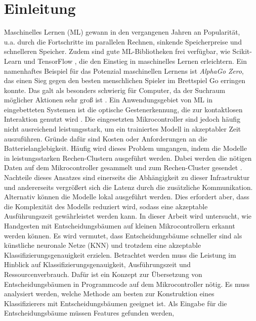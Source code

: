 \chapter{Einleitung}
Maschinelles Lernen (ML) gewann in den vergangenen Jahren an Popularität, u.a. durch die Fortschritte im parallelen Rechnen,
sinkende Speicherpreise und schnelleren Speicher. Zudem sind gute ML-Bibliotheken frei verfügbar, wie Scikit-Learn \cite{scikit-learn} und TensorFlow \cite{abadi2016tensorflow}, die
den Einstieg in maschinelles Lernen erleichtern. Ein namenhaftes Beispiel für das Potenzial maschinellen Lernens ist \textit{AlphaGo Zero},
das einen Sieg gegen den besten menschlichen Spieler im Brettspiel Go erringen konnte. Das galt als besonders schwierig für Computer,
da der Suchraum möglicher Aktionen sehr groß ist \cite{silver2017mastering}.
\newline
\newline
Ein Anwendungsgebiet von ML in eingebetteten Systemen ist die optische Gestenerkennung, die zur kontaktlosen Interaktion genutzt wird \cite{pavlovic1997visual}.
Die eingesetzten Mikrocontroller sind jedoch häufig nicht ausreichend leistungsstark, um ein trainiertes Modell in akzeptabler Zeit auszuführen. Gründe dafür sind
Kosten oder Anforderungen an die Batterielanglebigkeit. Häufig wird dieses Problem umgangen, indem die Modelle in leistungsstarken Rechen-Clustern ausgeführt werden.
Dabei werden die nötigen Daten auf dem Mikrocontroller gesammelt und zum Rechen-Cluster gesendet \cite{venzkeArticle}. Nachteile dieses Ansatzes sind einerseits die Abhängigkeit zu dieser
Infrastruktur und andererseits vergrößert sich die Latenz durch die zusätzliche Kommunikation. Alternativ können die Modelle lokal ausgeführt werden. Dies erfordert aber, dass die
Komplexität des Modells reduziert wird, sodass eine akzeptable Ausführungszeit gewährleistet werden kann.
\newline
\newline
In dieser Arbeit wird untersucht, wie Handgesten mit Entscheidungsbäumen auf kleinen Mikrocontrollern erkannt werden können. Es wird vermutet, dass Entscheidungsbäume schneller sind als künstliche neuronale Netze (KNN) und
trotzdem eine akzeptable Klassifizierungsgenauigkeit erzielen. Betrachtet werden muss die Leistung im Hinblick auf Klassifizierungsgenauigkeit, Ausführungszeit und Ressourcenverbrauch.
Dafür ist ein Konzept zur Übersetzung von Entscheidungsbäumen in Programmcode auf dem Mikrocontroller nötig.
Es muss analysiert werden, welche Methode am besten zur Konstruktion eines Klassifizierers mit Entscheidungsbäumen geeignet ist. Als Eingabe für die Entscheidungsbäume müssen Features gefunden werden,
